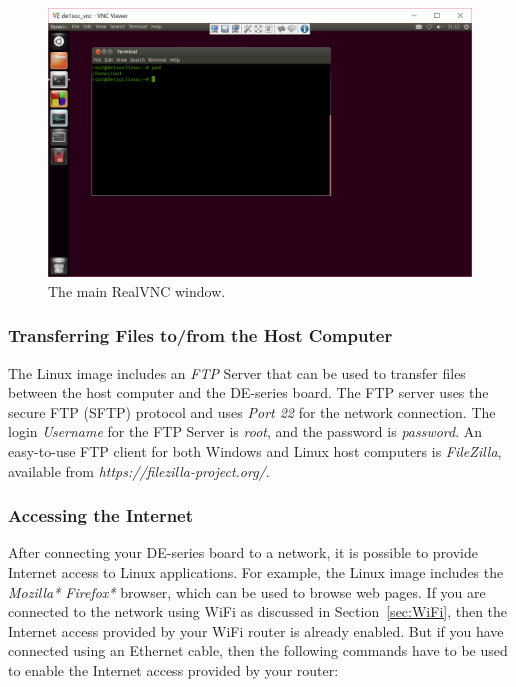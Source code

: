 \documentclass[11pt, twoside, pdftex]{article}
\begin{document}
\begin{figure}[H]
   \begin{center}
       \includegraphics[scale=0.5]{figures/VNC_2}
   \end{center}
   \caption{The main RealVNC window.}
	\label{fig:VNC_2}
\end{figure}

\subsubsection{Transferring Files to/from the Host Computer}
\label{sec:ftp}

The Linux image includes an {\it FTP} Server that can be used to transfer files
between the host computer and the DE-series board. The FTP server uses the secure FTP
(SFTP) protocol and uses {\it Port 22} for the network connection. The login 
{\it Username} for the FTP Server is {\it root}, and the password is {\it password}. An
easy-to-use FTP client for both Windows and Linux host computers is {\it FileZilla}, 
available from {\it https://filezilla-project.org/}.

\subsubsection{Accessing the Internet}

After connecting your DE-series board to a network, it is possible to provide Internet access 
to Linux applications. For example, the Linux image includes the 
{\it Mozilla* Firefox*} browser, which can be used to browse web pages. If you are connected
to the network using WiFi as discussed in Section~\ref{sec:WiFi}, then the Internet 
access provided by your WiFi router is already 
enabled. But if you have connected using an Ethernet cable, then the following commands have 
to be used to enable the Internet access provided by your router:
\end{document}
